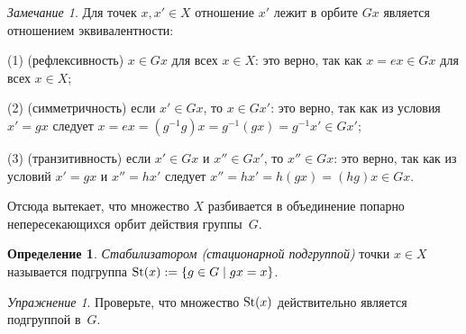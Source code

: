 \documentclass[a4paper,10pt]{amsart}
\def\St{{\rm St}}%
\theoremstyle{definition}
\newtheorem{definition}{Определение}
\theoremstyle{remark}
\newtheorem{exercise}{Упражнение}
\newtheorem{remark}{Замечание}
\begin{document}
\begin{remark}
Для точек $x, x' \in X$ отношение \guillemotleft$x'$ лежит в орбите
$Gx$\guillemotright{} является отношением эквивалентности:

(1) (рефлексивность) $x \in Gx$ для всех $x \in X$: это верно, так
как $x = ex \in Gx$ для всех $x \in X$;

(2) (симметричность) если $x' \in Gx$, то $x \in Gx'$: это верно,
так как из условия $x' = gx$ следует $x = ex = (g^{-1}g)x =
g^{-1}(gx) = g^{-1}x' \in Gx'$;

(3) (транзитивность) если $x' \in Gx$ и $x'' \in Gx'$, то $x'' \in
Gx$: это верно, так как из условий $x' = gx$ и $x'' = hx'$ следует
$x'' = hx' = h(gx) = (hg)x \in Gx$.

Отсюда вытекает, что множество $X$ разбивается в объединение попарно
непересекающихся орбит действия группы~$G$.
\end{remark}

\begin{definition}
{\it Стабилизатором \textup(стационарной подгруппой\textup)} точки
$x \in X$ называется подгруппа $\St(x) := \{ g \in G \mid gx = x
\}$.
\end{definition}

\begin{exercise}
Проверьте, что множество $\St(x)$ действительно является подгруппой
в~$G$.
\end{exercise}
\end{document}
